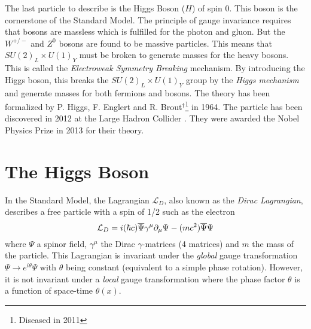 The last particle to describe is the Higgs Boson ($H$) of spin 0. This boson is the cornerstone of the Standard Model. The principle of gauge invariance requires that bosons are massless which is fulfilled for the photon and gluon. But the $W^{+/-}$ and $Z^0$ bosons are found to be massive particles. This means that $SU(2)_{L} \times U(1)_{Y}$ must be broken to generate masses for the heavy bosons. This is called the \textit{Electroweak Symmetry Breaking} mechanism. By introducing the Higgs boson, this breaks the $SU(2)_{L} \times U(1)_{Y}$ group by the \textit{Higgs mechanism} and generate masses for both fermions and bosons. The theory \cite{Higgs:1964pj, Englert:1964et} has been formalized by P. Higgs, F. Englert and R. Brout$^\dagger$\footnote{Diseased in 2011} in 1964. The particle has been discovered in 2012 at the Large Hadron Collider \cite{Aad:2012tfa, Chatrchyan:2012xdj}. They were awarded the Nobel Physics Prize in 2013 for their theory.

\section{The Higgs Boson}
\label{sec:HiggsTheo}

In the Standard Model, the Lagrangian $\mathcal{L}_{D}$, also known as the \textit{Dirac Lagrangian}, describes a free particle with a spin of 1/2 such as the electron \cite{Griffiths:343277}
\begin{equation}
  \mathcal{L}_{D} = i(\hbar c)\overline{\rm \Psi}\gamma^{\mu}\partial_{\mu}\Psi - (mc^2)\overline{\rm \Psi}\Psi
\end{equation}
where $\Psi$ a spinor field, $\gamma^{\mu}$ the Dirac $\gamma$-matrices (4 matrices) \cite{Peskin:1995ev} and $m$ the mass of the particle. This Lagrangian is invariant under the \textit{global} gauge transformation $\Psi \rightarrow e^{i\theta}\Psi$ with $\theta$ being constant (equivalent to a simple phase rotation). However, it is not invariant under a \textit{local} gauge transformation where the phase factor $\theta$ is a function of space-time $\theta(x)$.

